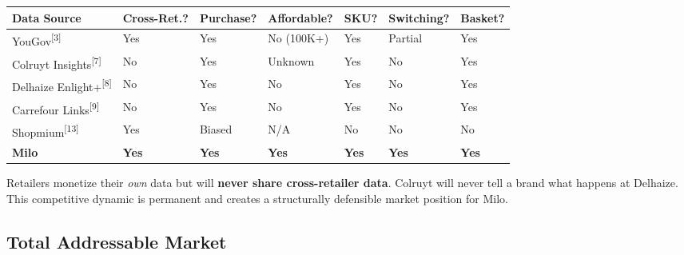 \documentclass[11pt,a4paper]{article}
\begin{document}
\begin{center}
\renewcommand{\arraystretch}{1.3}
\begin{tabularx}{\textwidth}{L{2.6cm} C{1.6cm} C{1.6cm} C{1.8cm} C{1.5cm} C{1.6cm} C{1.6cm}}
\toprule
{}
\textbf{\color{white}Data Source} & \textbf{\color{white}Cross-Ret.?} & \textbf{\color{white}Purchase?} & \textbf{\color{white}Affordable?} & \textbf{\color{white}SKU?} & \textbf{\color{white}Switching?} & \textbf{\color{white}Basket?} \\
\midrule
YouGov\textsuperscript{[3]} & Yes & Yes & \textcolor{milored}{No (\texteuro{}100K+)} & Yes & Partial & Yes \\
Colruyt Insights\textsuperscript{[7]} & \textcolor{milored}{No} & Yes & Unknown & Yes & \textcolor{milored}{No} & Yes \\
Delhaize Enlight+\textsuperscript{[8]} & \textcolor{milored}{No} & Yes & \textcolor{milored}{No} & Yes & \textcolor{milored}{No} & Yes \\
Carrefour Links\textsuperscript{[9]} & \textcolor{milored}{No} & Yes & \textcolor{milored}{No} & Yes & \textcolor{milored}{No} & Yes \\
Shopmium\textsuperscript{[13]} & Yes & \textcolor{milored}{Biased} & N/A & \textcolor{milored}{No} & \textcolor{milored}{No} & \textcolor{milored}{No} \\
\textbf{\color{miloprimary}Milo} & \textbf{\color{milogreen}Yes} & \textbf{\color{milogreen}Yes} & \textbf{\color{milogreen}Yes} & \textbf{\color{milogreen}Yes} & \textbf{\color{milogreen}Yes} & \textbf{\color{milogreen}Yes} \\
\bottomrule
\end{tabularx}
\end{center}

Retailers monetize their \emph{own} data but will \textbf{never share cross-retailer data}. Colruyt will never tell a brand what happens at Delhaize. This competitive dynamic is permanent and creates a structurally defensible market position for Milo.

\subsection{Total Addressable Market}
\end{document}
